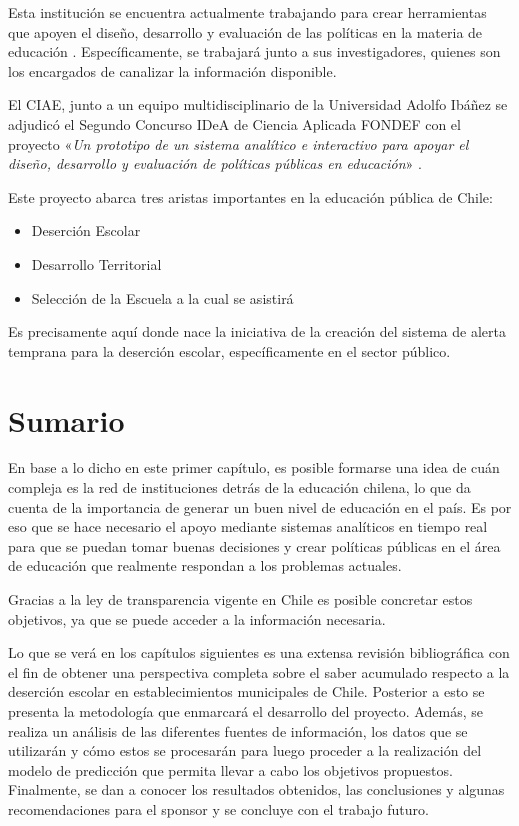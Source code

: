 Esta institución se encuentra actualmente trabajando para crear herramientas que apoyen el diseño, desarrollo y evaluación de las políticas en la materia de educación \cite{tools}. Específicamente, se  trabajará junto a sus investigadores, quienes son los encargados de canalizar la información disponible.

El CIAE, junto a un equipo multidisciplinario de la Universidad Adolfo Ibáñez se adjudicó el Segundo Concurso IDeA de Ciencia Aplicada FONDEF con el proyecto «\textit{Un prototipo de un sistema analítico e interactivo para apoyar el diseño, desarrollo y evaluación de políticas públicas en educación}» \cite{noticia}. 

Este proyecto abarca tres aristas importantes en la educación pública de Chile:
\begin{itemize}
    \item Deserción Escolar
    \item Desarrollo Territorial
    \item Selección de la Escuela a la cual se asistirá
\end{itemize}

Es precisamente aquí donde nace la iniciativa de la creación del sistema de alerta temprana para la deserción escolar, específicamente en el sector público. 

\section{Sumario}

En base a lo dicho en este primer capítulo, es posible formarse una idea de cuán compleja es la red de instituciones detrás de la educación chilena, lo que da cuenta de la importancia de generar un buen nivel de educación en el país. Es por eso que se hace necesario el apoyo mediante sistemas analíticos en tiempo real para que se puedan tomar buenas decisiones y crear políticas públicas en el área de educación que realmente respondan a los problemas actuales. 

Gracias a la ley de transparencia vigente en Chile es posible concretar estos objetivos, ya que se puede acceder a la información necesaria.

Lo que se verá en los capítulos siguientes es una extensa revisión bibliográfica con el fin de obtener una perspectiva completa sobre el saber acumulado respecto a la deserción escolar en establecimientos municipales de Chile. Posterior a esto se presenta la metodología que enmarcará el desarrollo del proyecto. Además, se realiza un análisis de las diferentes fuentes de información, los datos que se utilizarán y cómo estos se procesarán para luego proceder a la realización del modelo de predicción que permita llevar a cabo los objetivos propuestos. Finalmente, se dan a conocer los resultados obtenidos, las conclusiones y algunas recomendaciones para el sponsor y se concluye con el trabajo futuro.